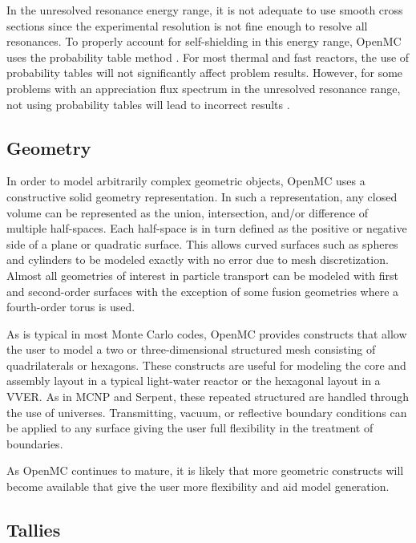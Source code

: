 \documentclass{elsarticle}
\begin{document}
In the unresolved resonance energy range, it is not adequate to use smooth cross
sections since the experimental resolution is not fine enough to resolve all
resonances. To properly account for self-shielding in this energy range, OpenMC
uses the probability table method \cite{probtables}. For most thermal and fast
reactors, the use of probability tables will not significantly affect problem
results. However, for some problems with an appreciation flux spectrum in the
unresolved resonance range, not using probability tables will lead to incorrect
results \cite{probtables-testing}.

\subsection{Geometry}

In order to model arbitrarily complex geometric objects, OpenMC uses a
constructive solid geometry representation. In such a representation, any closed
volume can be represented as the union, intersection, and/or difference of
multiple half-spaces. Each half-space is in turn defined as the positive or
negative side of a plane or quadratic surface. This allows curved surfaces such
as spheres and cylinders to be modeled exactly with no error due to mesh
discretization. Almost all geometries of interest in particle transport can be
modeled with first and second-order surfaces with the exception of some fusion
geometries where a fourth-order torus is used.

As is typical in most Monte Carlo codes, OpenMC provides constructs that allow
the user to model a two or three-dimensional structured mesh consisting of
quadrilaterals or hexagons. These constructs are useful for modeling the core
and assembly layout in a typical light-water reactor or the hexagonal layout in
a VVER. As in MCNP and Serpent, these repeated structured are handled through
the use of universes. Transmitting, vacuum, or reflective boundary conditions
can be applied to any surface giving the user full flexibility in the treatment
of boundaries.

As OpenMC continues to mature, it is likely that more geometric constructs will
become available that give the user more flexibility and aid model generation.

\subsection{Tallies}
\end{document}
